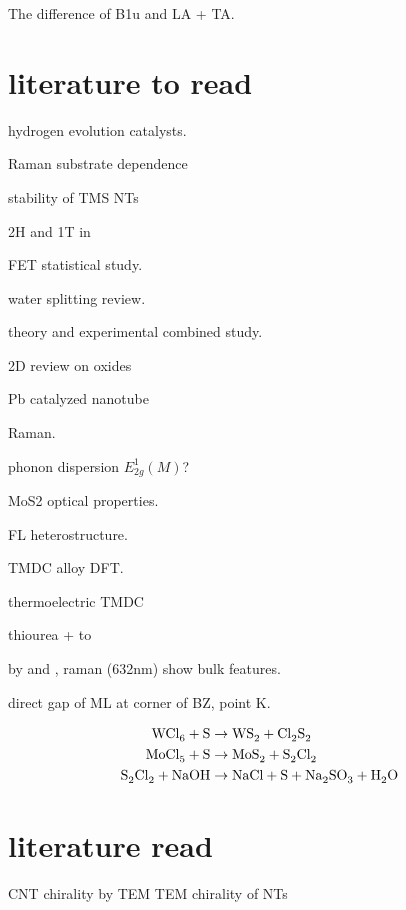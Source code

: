 The difference of B1u and LA + TA.

\section{literature to read}

hydrogen evolution catalysts. \cite{Merki2011}

Raman substrate dependence \cite{Buscema2013}

stability of TMS NTs \cite{Seifert2002}

2H and 1T in  \cite{Eda2012}

 FET statistical study. \cite{Liu2013i}

water splitting review. \cite{B800489G}

 theory and experimental combined study. \cite{Klein2001}

2D review on oxides \cite{Osada2012}

Pb catalyzed  nanotube \cite{Brontvein2012}

 Raman.\cite{Zhao2013} \cite{Sekine1980}

phonon dispersion $E_{2g}^1(M)$? \cite{Ataca2012}

MoS2 optical properties.\cite{Search1979}

FL heterostructure. \cite{Yu2013a}

\cite{Kang2013} TMDC alloy DFT.

thermoelectric TMDC \cite{Wickramaratne2014}

 thiourea +  to  \cite{Leonard-Deepak2011}

 by  and , raman (632nm) show bulk features\cite{Tenne2008}.

direct gap of ML at corner of BZ, point K.

\begin{align}
\cee{WCl6 + S &\rightarrow WS2 + Cl2S2}\\
\cee{MoCl5 + S &\rightarrow MoS2 + S2Cl2} \\
\cee{S2Cl2 + NaOH &\rightarrow NaCl + S + Na2SO3 + H2O}
\end{align}

\section{literature read}

CNT chirality by TEM \cite{Zhang1993} TEM chirality of  NTs


